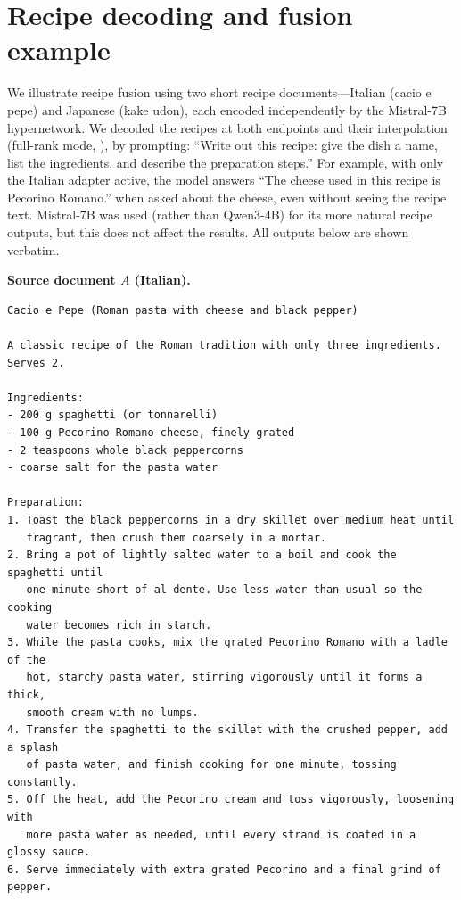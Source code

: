\section{Recipe decoding and fusion example}
\label{app:recipe-fusion}

We illustrate recipe fusion using two short recipe documents—Italian (cacio e pepe) and Japanese (kake udon), each encoded independently by the Mistral-7B \doctolora hypernetwork. 
We decoded the recipes at both endpoints and their interpolation (full-rank mode, ), by prompting: ``Write out this recipe: give the dish a name, list the ingredients, and describe the preparation steps.'' 
For example, with only the Italian adapter active, the model answers ``The cheese used in this recipe is Pecorino Romano.'' when asked about the cheese, even without seeing the recipe text. 
Mistral-7B was used (rather than Qwen3-4B) for its more natural recipe outputs, but this does not affect the results.
All outputs below are shown verbatim.

\textbf{Source document $A$ (Italian).}

\begin{snugshade}
\begin{Verbatim}[breaklines=true,breakanywhere=true,fontsize=\footnotesize]
Cacio e Pepe (Roman pasta with cheese and black pepper)

A classic recipe of the Roman tradition with only three ingredients. Serves 2.

Ingredients:
- 200 g spaghetti (or tonnarelli)
- 100 g Pecorino Romano cheese, finely grated
- 2 teaspoons whole black peppercorns
- coarse salt for the pasta water

Preparation:
1. Toast the black peppercorns in a dry skillet over medium heat until
   fragrant, then crush them coarsely in a mortar.
2. Bring a pot of lightly salted water to a boil and cook the spaghetti until
   one minute short of al dente. Use less water than usual so the cooking
   water becomes rich in starch.
3. While the pasta cooks, mix the grated Pecorino Romano with a ladle of the
   hot, starchy pasta water, stirring vigorously until it forms a thick,
   smooth cream with no lumps.
4. Transfer the spaghetti to the skillet with the crushed pepper, add a splash
   of pasta water, and finish cooking for one minute, tossing constantly.
5. Off the heat, add the Pecorino cream and toss vigorously, loosening with
   more pasta water as needed, until every strand is coated in a glossy sauce.
6. Serve immediately with extra grated Pecorino and a final grind of pepper.
\end{Verbatim}
\end{snugshade}

